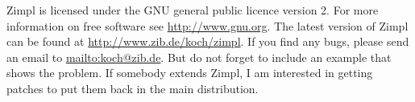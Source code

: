 \documentclass[12pt]{article}
\newcommand{\zimpl}{{\sc Zimpl}\xspace}
\begin{document}
\bigskip
\zimpl is licensed under the GNU general public licence version 2.
For more information on free software see \url{http://www.gnu.org}.
The latest version of \zimpl can be found at
\url{http://www.zib.de/koch/zimpl}.
If you find any bugs, please send an email to
\url{mailto:koch@zib.de}. 
But do not forget to 
include an example that shows the problem.
If somebody extends \zimpl, I am interested in getting patches
to put them back in the main distribution.

\nocite{*}



{\vfill\tiny\hfill\fbox{\rcsInfoRevision}}
\end{document}
